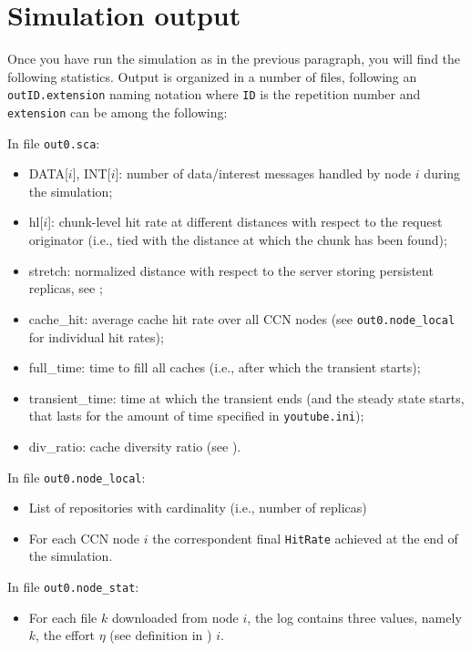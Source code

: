 \documentclass[10pt]{article}
\begin{document}


\section{Simulation output}

Once you have run the simulation as in the previous paragraph, you will find the following statistics. Output is organized in a number of files, following an \verb!outID.extension! naming notation where \verb!ID! is the repetition number and \verb!extension! can be among the following:

\noindent In file \verb!out0.sca!:
\begin{itemize}
\item DATA[$i$], INT[$i$]: number of data/interest messages handled by node $i$ during the simulation;
\item hl[$i$]: chunk-level hit rate at different distances with respect to the request originator (i.e., tied with the distance at which the chunk has been found);
\item stretch: normalized distance with respect to the server storing persistent replicas, see \cite{tr1,tr2}; 
\item cache\_hit: average cache hit rate over all CCN nodes  (see \verb!out0.node_local! for individual hit rates);
\item full\_time: time to fill all caches (i.e., after which the transient starts); 
\item transient\_time: time at which the transient ends (and the steady state starts, that lasts for the amount of time specified in \verb!youtube.ini!);
\item div\_ratio: cache diversity ratio (see \cite{tr1}).
\end{itemize}

\noindent In file \verb!out0.node_local!:
\begin{itemize}
\item List of repositories with cardinality (i.e., number of replicas)
\item For each CCN node $i$ the correspondent final \verb!HitRate! achieved at the end of the simulation.
\end{itemize}

\noindent In file \verb!out0.node_stat!:
\begin{itemize}
\item For each file $k$ downloaded from node $i$, the log contains three values, namely $k$, the effort $\eta$ (see definition in \cite{tr2}) $i$.  
\end{itemize}
\end{document}
